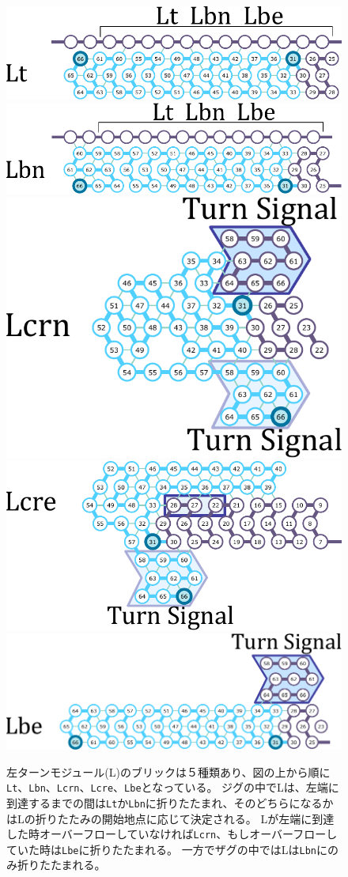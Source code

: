 \documentclass[a4j,11pt]{article}
\begin{document}
%
%
\begin{figure}[tb]
  \centering
   \includegraphics[width=0.6\linewidth]{fig/svg/Lt_3.pdf}\\
   \vspace*{3mm}
   \includegraphics[width=0.6\linewidth]{fig/svg/Lbc_3.pdf}\\
   \vspace*{3mm}
   \includegraphics[width=0.4\linewidth]{fig/svg/Ltrc_3.pdf}\\
   \vspace*{3mm}
   \includegraphics[width=0.5\linewidth]{fig/svg/Ltre_3.pdf}\\
   \includegraphics[width=0.6\linewidth]{fig/svg/Lbe_3.pdf}
 
 \caption{左ターンモジュール(L)のブリックは５種類あり、図の上から順に\texttt{Lt}、\texttt{Lbn}、\texttt{Lcrn}、\texttt{Lcre}、\texttt{Lbe}となっている。
ジグの中でLは、左端に到達するまでの間は\texttt{Lt}か\texttt{Lbn}に折りたたまれ、そのどちらになるかはLの折りたたみの開始地点に応じて決定される。
Lが左端に到達した時オーバーフローしていなければ\texttt{Lcrn}、もしオーバーフローしていた時は\texttt{Lbe}に折りたたまれる。
一方でザグの中ではLは\texttt{Lbn}にのみ折りたたまれる。}
 \label{fig:leftturns}
\end{figure}
\end{document}

